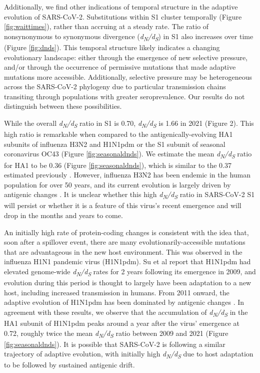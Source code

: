 \documentclass[11pt,oneside,letterpaper]{article}
\begin{document}
Additionally, we find other indications of temporal structure in the adaptive evolution of SARS-CoV-2. 
Substitutions within S1 cluster temporally (Figure \ref{fig:waittimes}), rather than accruing at a steady rate.
The ratio of nonsynonymous to synonymous divergence (\emph{d\textsubscript{N}/d\textsubscript{S}}) in S1 also increases over time (Figure \ref{fig:dnds}).
This temporal structure likely indicates a changing evolutionary landscape: either through the emergence of new selective pressure, and/or through the occurrence of permissive mutations that made adaptive mutations more accessible.
Additionally, selective pressure may be heterogeneous across the SARS-CoV-2 phylogeny due to particular transmission chains transiting through populations with greater seroprevalence. 
Our results do not distinguish between these possibilities.

While the overall \emph{d\textsubscript{N}/d\textsubscript{S}} ratio in S1 is 0.70, \emph{d\textsubscript{N}/d\textsubscript{S}} is 1.66 in 2021 (Figure 2). 
This high ratio is remarkable when compared to the antigenically-evolving HA1 subunits of influenza H3N2 and H1N1pdm or the S1 subunit of seasonal coronavirus OC43 (Figure \ref{fig:seasonaldnds}). 
We estimate the mean \emph{d\textsubscript{N}/d\textsubscript{S}} ratio for HA1 to be 0.36 (Figure \ref{fig:seasonaldnds}), which is similar to the 0.37 estimated previously \cite{Wolf2006-vy}. 
However, influenza H3N2 has been endemic in the human population for over 50 years, and its current evolution is largely driven by antigenic changes \cite{Smith2004-if}. 
It is unclear whether this high \emph{d\textsubscript{N}/d\textsubscript{S}} ratio in SARS-CoV-2 S1 will persist or whether it is a feature of this virus's recent emergence and will drop in the months and years to come.

An initially high rate of protein-coding changes is consistent with the idea that, soon after a spillover event, there are many evolutionarily-accessible mutations that are advantageous in the new host environment.
This was observed in the influenza H1N1 pandemic virus (H1N1pdm).
Su et al \cite{Su2015-az} report that H1N1pdm had elevated genome-wide \emph{d\textsubscript{N}/d\textsubscript{S}} rates for 2 years following its emergence in 2009, and evolution during this period is thought to largely have been adaptation to a new host, including increased transmission in humans.
From 2011 onward, the adaptive evolution of H1N1pdm has been dominated by antigenic changes \cite{Su2015-az}.
In agreement with these results, we observe that the accumulation of \emph{d\textsubscript{N}/d\textsubscript{S}} in the HA1 subunit of H1N1pdm peaks around a year after the virus' emergence at 0.72, roughly twice the mean \emph{d\textsubscript{N}/d\textsubscript{S}} ratio between 2009 and 2021 (Figure \ref{fig:seasonaldnds}).
It is possible that SARS-CoV-2 is following a similar trajectory of adaptive evolution, with initially high \emph{d\textsubscript{N}/d\textsubscript{S}} due to host adaptation to be followed by sustained antigenic drift.
\end{document}
